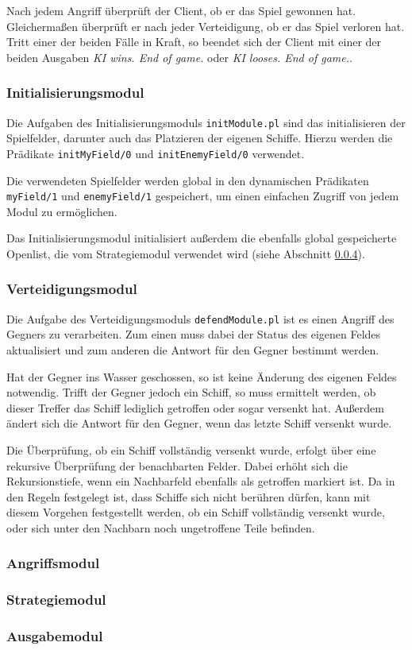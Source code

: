 	Nach jedem Angriff überprüft der Client, ob er das Spiel gewonnen hat. Gleichermaßen überprüft er nach jeder Verteidigung, 
	ob er das Spiel verloren hat. Tritt einer der beiden Fälle in Kraft, so beendet sich der Client mit einer der beiden Ausgaben
	\textit{KI wins. End of game.} oder \textit{KI looses. End of game.}.
	

\subsubsection{Initialisierungsmodul} \label{sec:initModule}
	Die Aufgaben des Initialisierungsmoduls \texttt{initModule.pl} sind das initialisieren der Spielfelder, darunter auch
	das Platzieren der eigenen Schiffe. Hierzu werden die Prädikate \texttt{initMyField/0} und \texttt{initEnemyField/0} verwendet.
	
	Die verwendeten Spielfelder werden global in den dynamischen Prädikaten \texttt{myField/1} und \texttt{enemyField/1}
	gespeichert, um einen einfachen Zugriff von jedem Modul zu ermöglichen. 
	
	Das Initialisierungsmodul initialisiert außerdem die ebenfalls global gespeicherte Openlist, 
	die vom Strategiemodul verwendet wird (siehe Abschnitt \ref{sec:strategy}). 

\subsubsection{Verteidigungsmodul} \label{sec:defendModule}
	Die Aufgabe des Verteidigungsmoduls \texttt{defendModule.pl} ist es einen Angriff des Gegners zu verarbeiten.
	Zum einen muss dabei der Status des eigenen Feldes aktualisiert und zum anderen die Antwort für den Gegner bestimmt werden.
	
	Hat der Gegner ins Wasser geschossen, so ist keine Änderung des eigenen Feldes notwendig. Trifft der Gegner jedoch ein Schiff,
	so muss ermittelt werden, ob dieser Treffer das Schiff lediglich getroffen oder sogar versenkt hat. Außerdem ändert sich die Antwort
	für den Gegner, wenn das letzte Schiff versenkt wurde.
	
	Die Überprüfung, ob ein Schiff vollständig versenkt wurde, erfolgt über eine rekursive Überprüfung der benachbarten Felder.
	Dabei erhöht sich die Rekursionstiefe, wenn ein Nachbarfeld ebenfalls als getroffen markiert ist. 
	Da in den Regeln festgelegt ist, dass Schiffe sich nicht berühren dürfen, kann mit diesem Vorgehen festgestellt werden, ob ein Schiff
	vollständig versenkt wurde, oder sich unter den Nachbarn noch ungetroffene Teile befinden.
	
	
	
\subsubsection{Angriffsmodul} \label{sec:attackModule}


\subsubsection{Strategiemodul} \label{sec:strategy}


\subsubsection{Ausgabemodul}


